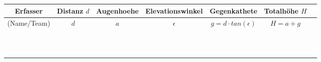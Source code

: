 


\renewcommand{\metaHeaderLine}{Arbeitsblatt}
\renewcommand{\arbeitsblattTitel}{Höhenmessung}

\arbeitsblattHeader{}



\begin{center}
\end{center}

\newcommand{\noteSpace}{\noTRAINER{\rule{0pt}{6.5ex}}}

\begin{tabular}{|c|c|c|c|c|c|c|}
\hline
Erfasser & Distanz $d$ & Augenhoehe & Elevationswinkel & Gegenkathete & Totalhöhe $H$ \\
\hline
(Name/Team) & $d$ & $a$ & $\epsilon$ &  $g=d\cdot tan(\epsilon)$ & $H=a + g$ \\
\hline
\noteSpace{}&&&&&\\
\hline
\noteSpace{}&&&&&\\
\hline
\noteSpace{}&&&&&\\
\hline
\noteSpace{}&&&&&\\
\hline
\noteSpace{}&&&&&\\
\hline
\noteSpace{}&&&&&\\
\hline
\noteSpace{}&&&&&\\
\hline
\noteSpace{}&&&&&\\
\hline
\noteSpace{}&&&&&\\
\hline
\noteSpace{}&&&&&\\
\hline
\noteSpace{}&&&&&\\
\hline
\end{tabular}


